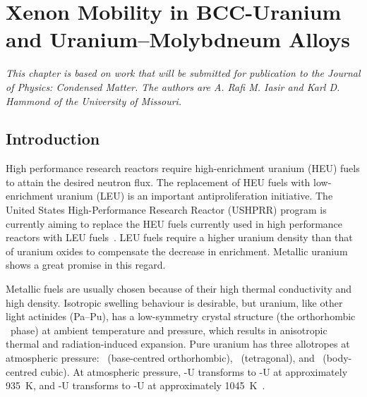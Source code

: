 \chapter[Xenon Mobility in \protect\NoCaseChange{U--Mo} fuel]{Xenon Mobility in BCC-Uranium and Uranium--Molybdneum Alloys}
\textit{This chapter is based on work that will be submitted for publication to the Journal of Physics: Condensed Matter. The authors are A. Rafi M. Iasir and Karl D. Hammond of the University of Missouri.}



\section{Introduction}\label{sec_intro}
High performance research reactors require high-enrichment uranium (HEU) fuels
to attain the desired neutron flux. The replacement of HEU fuels with
low-enrichment uranium (LEU) is an important antiproliferation initiative. The
United States High-Performance Research Reactor (USHPRR) program is currently
aiming to replace the HEU fuels currently used in high performance reactors
with LEU fuels~\cite{snelgrove1997development}.
LEU fuels require a higher uranium density than that of uranium oxides
to compensate the decrease in  enrichment.
Metallic uranium shows a great promise in this regard.

Metallic fuels are usually chosen because of their high thermal conductivity
and high density. Isotropic swelling behaviour is desirable, but uranium,
like other light actinides (Pa--Pu), has a low-symmetry crystal structure
(the orthorhombic \textalpha\ phase) at ambient temperature and pressure,
which results in anisotropic thermal and radiation-induced expansion.
Pure uranium has three allotropes at atmospheric pressure:
\textalpha\ (base-centred orthorhombic), \textbeta\ (tetragonal), and
\textgamma\ (body-centred cubic). At atmospheric pressure, \mbox{\textalpha-U}
transforms to \mbox{\textbeta-U} at approximately 935~K, and \mbox{\textbeta-U}
transforms to \mbox{\textgamma-U} at approximately
1045~K~\cite{lawson1988structure,akella1997structural}. 


